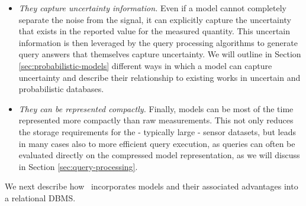 \begin{itemize}
\item \emph{They capture uncertainty information.} Even if a model cannot completely separate the noise from the signal, it can explicitly capture the uncertainty that exists in the reported value for the measured quantity. This uncertain information is then leveraged by the query processing algorithms to generate query answers that themselves capture uncertainty. We will outline in Section \ref{sec:probabilistic-models} different ways in which a model can capture uncertainty and describe their relationship to existing works in uncertain and probabilistic databases.
\item \emph{They can be represented compactly.} Finally, models can be most of the time represented more compactly than raw measurements. This not only reduces the storage requirements for the - typically large - sensor datasets, but leads in many cases also to more efficient query execution, as queries can often be evaluated directly on the compressed model representation, as we will discuss in Section \ref{sec:query-processing}.
\end{itemize}

We next describe how \projName\ incorporates models and their associated advantages into a relational DBMS.

